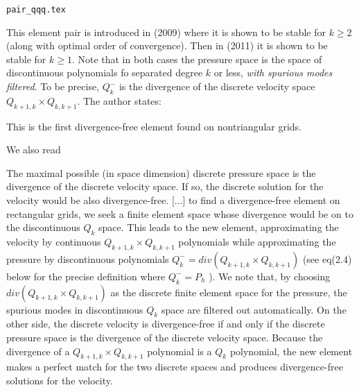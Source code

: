 \begin{flushright} {\tiny {\color{gray} \tt pair\_qqq.tex}} \end{flushright}

This element pair is introduced in \textcite{zhan09} (2009) where it is 
shown to be stable for $k\ge 2$ (along with optimal order of convergence). 
Then in \textcite{huzh11} (2011) it is 
shown to be stable for $k\ge 1$. 
Note that in both cases the pressure space is the space of discontinuous 
polynomials fo separated degree $k$ or less, {\it with spurious modes filtered}.
To be precise, $Q_k^-$ is the divergence of the discrete velocity space $Q_{k+1,k}\times Q_{k,k+1}$.
The author states:
\begin{displayquote}
{\color{darkgray}
This is the ﬁrst divergence-free element found on nontriangular grids. }
\end{displayquote}
We also read
\begin{displayquote}
{\color{darkgray}
The maximal possible (in space dimension) discrete pressure space
is the divergence of the discrete velocity space.
If so, the discrete solution for the
velocity would be also divergence-free.
[...]
to ﬁnd a divergence-free element on rectangular grids, we seek a ﬁnite element space
whose divergence would be on to the discontinuous $Q_k$ space. This leads to the new
element, approximating the velocity by continuous $Q_{k+1,k}\times Q_{k,k+1}$ polynomials while
approximating the pressure by discontinuous polynomials $Q_k^- = div(Q_{k+1,k}\times Q_{k,k+1} )$
(see eq(2.4) below for the precise deﬁnition where $Q_k^- = P_h$ ).
We note that, by choosing $div(Q_{k+1,k}\times Q_{k,k+1})$ as the discrete ﬁnite element space for the pressure, the spurious
modes in discontinuous $Q_k$ space are filtered out automatically. On the other side,
the discrete velocity is divergence-free if and only if the discrete pressure space is
the divergence of the discrete velocity space. Because the divergence of a $Q_{k+1,k} \times Q_{k,k+1}$ 
polynomial is a $Q_k$ polynomial, the new element makes a perfect match for
the two discrete spaces and produces divergence-free solutions for the velocity.
}
\end{displayquote}



